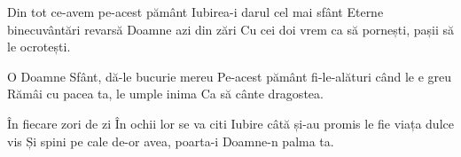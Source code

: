 
\beginverse
Din tot ce-avem pe-acest pământ
Iubirea-i darul cel mai sfânt
Eterne binecuvântări revarsă Doamne azi din zări
Cu cei doi vrem ca să pornești, pașii să le ocrotești.
\endverse

\beginchorus
O Doamne Sfânt, dă-le bucurie mereu
Pe-acest pământ fi-le-alături când le e greu
Rămâi cu pacea ta, le umple inima
Ca să cânte dragostea.
\endchorus

\beginverse
În fiecare zori de zi
În ochii lor se va citi
Iubire câtă și-au promis le fie viața dulce vis
Și spini pe cale de-or avea, poarta-i Doamne-n palma ta.
\endverse

\endsong